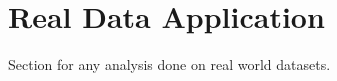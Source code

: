 \section{Real Data Application}\label{sec:realdata}

Section for any analysis done on real world datasets.
